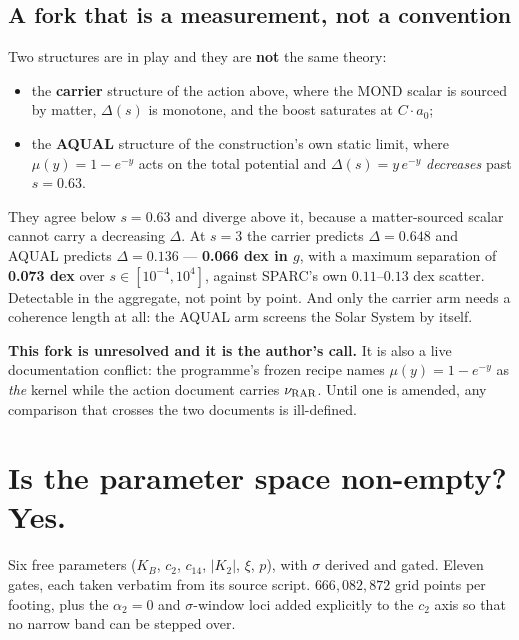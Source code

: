 \documentclass[11pt,letterpaper]{article}
\begin{document}
\subsection{A fork that is a measurement, not a convention}
Two structures are in play and they are \textbf{not} the same theory:
\begin{itemize}
\item the \textbf{carrier} structure of the action above, where the MOND scalar is sourced by matter, $\Delta(s)$ is monotone, and the boost saturates at $C\!\cdot\!a_0$;
\item the \textbf{AQUAL} structure \cite{bm84} of the construction's own static limit, where $\mu(y)=1-e^{-y}$ acts on the total potential and $\Delta(s)=y\,e^{-y}$ \emph{decreases} past $s=0.63$.
\end{itemize}
They agree below $s=0.63$ and diverge above it, because a matter-sourced scalar cannot carry a decreasing $\Delta$. At $s=3$ the carrier predicts $\Delta=0.648$ and AQUAL predicts $\Delta=0.136$ --- \textbf{0.066 dex in $g$}, with a maximum separation of \textbf{0.073 dex} over $s\in[10^{-4},10^{4}]$, against SPARC's own $0.11$--$0.13$ dex scatter. Detectable in the aggregate, not point by point. And only the carrier arm needs a coherence length at all: the AQUAL arm screens the Solar System by itself.

\textbf{This fork is unresolved and it is the author's call.} It is also a live documentation conflict: the programme's frozen recipe names $\mu(y)=1-e^{-y}$ as \emph{the} kernel while the action document carries $\nu_{\rm RAR}$. Until one is amended, any comparison that crosses the two documents is ill-defined.

\section{Is the parameter space non-empty? Yes.}\label{sec:nonempty}
Six free parameters ($K_B$, $c_2$, $c_{14}$, $|K_2|$, $\xi$, $p$), with $\sigma$ derived and gated. Eleven gates, each taken verbatim from its source script. $666{,}082{,}872$ grid points per footing, plus the $\alpha_2=0$ and $\sigma$-window loci added explicitly to the $c_2$ axis so that no narrow band can be stepped over.
\end{document}
